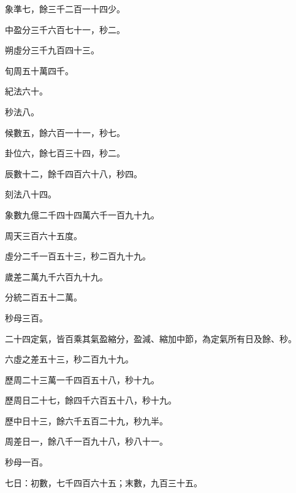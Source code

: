 \begin{pinyinscope}
 象準七，餘三千二百一十四少。



 中盈分三千六百七十一，秒二。



 朔虛分三千九百四十三。



 旬周五十萬四千。



 紀法六十。



 秒法八。



 候數五，餘六百一十一，秒七。



 卦位六，餘七百三十四，秒二。



 辰數十二，餘千四百六十八，秒四。



 刻法八十四。



 象數九億二千四十四萬六千一百九十九。



 周天三百六十五度。



 虛分二千一百五十三，秒二百九十九。



 歲差二萬九千六百九十九。



 分統二百五十二萬。



 秒母三百。



 二十四定氣，皆百乘其氣盈縮分，盈減、縮加中節，為定氣所有日及餘、秒。



 六虛之差五十三，秒二百九十九。



 歷周二十三萬一千四百五十八，秒十九。



 歷周日二十七，餘四千六百五十八，秒十九。



 歷中日十三，餘六千五百二十九，秒九半。



 周差日一，餘八千一百九十八，秒八十一。



 秒母一百。



 七日：初數，七千四百六十五；末數，九百三十五。




\end{pinyinscope}
